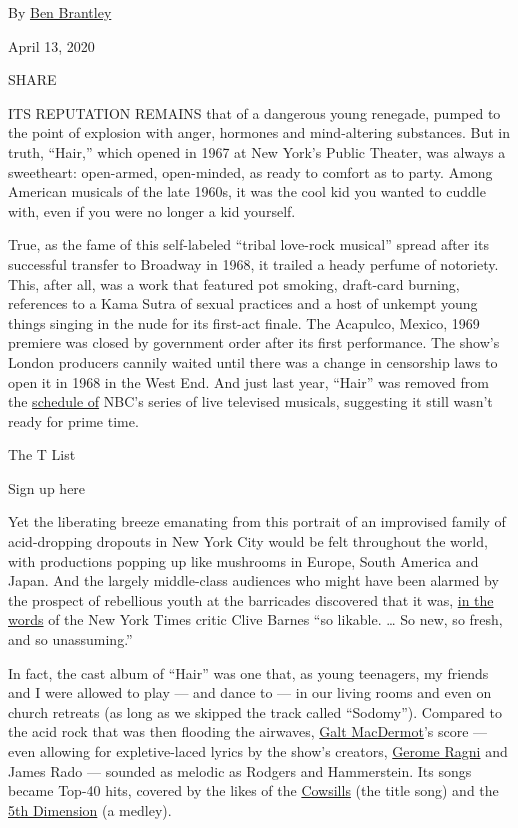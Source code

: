 By \href{https://www.nytimes.com/by/ben-brantley}{Ben Brantley}

April 13, 2020

SHARE

ITS REPUTATION REMAINS that of a dangerous young renegade, pumped to the
point of explosion with anger, hormones and mind-altering substances.
But in truth, ``Hair,'' which opened in 1967 at New York's Public
Theater, was always a sweetheart: open-armed, open-minded, as ready to
comfort as to party. Among American musicals of the late 1960s, it was
the cool kid you wanted to cuddle with, even if you were no longer a kid
yourself.

True, as the fame of this self-labeled ``tribal love-rock musical''
spread after its successful transfer to Broadway in 1968, it trailed a
heady perfume of notoriety. This, after all, was a work that featured
pot smoking, draft-card burning, references to a Kama Sutra of sexual
practices and a host of unkempt young things singing in the nude for its
first-act finale. The Acapulco, Mexico, 1969 premiere was closed by
government order after its first performance. The show's London
producers cannily waited until there was a change in censorship laws to
open it in 1968 in the West End. And just last year, ``Hair'' was
removed from the
\href{https://www.nytimes.com/2018/05/25/arts/television/hair-live-nbc.html}{schedule
of} NBC's series of live televised musicals, suggesting it still wasn't
ready for prime time.

The T List \textbar{}

Sign up here

Yet the liberating breeze emanating from this portrait of an improvised
family of acid-dropping dropouts in New York City would be felt
throughout the world, with productions popping up like mushrooms in
Europe, South America and Japan. And the largely middle-class audiences
who might have been alarmed by the prospect of rebellious youth at the
barricades discovered that it was,
\href{https://www.nytimes.com/1968/04/30/archives/theater-hair-its-fresh-and-frank-likable-rock-musical-moves-to.html}{in
the words} of the New York Times critic Clive Barnes ``so likable.
\ldots{} So new, so fresh, and so unassuming.''

In fact, the cast album of ``Hair'' was one that, as young teenagers, my
friends and I were allowed to play --- and dance to --- in our living
rooms and even on church retreats (as long as we skipped the track
called ``Sodomy''). Compared to the acid rock that was then flooding the
airwaves,
\href{https://www.nytimes.com/2018/12/18/obituaries/galt-macdermot-dead.html}{Galt
MacDermot}'s score --- even allowing for expletive-laced lyrics by the
show's creators,
\href{https://www.nytimes.com/1991/07/13/obituaries/gerome-ragni-48-a-stage-actor-co-author-of-broadway-s-hair.html}{Gerome
Ragni} and James Rado --- sounded as melodic as Rodgers and Hammerstein.
Its songs became Top-40 hits, covered by the likes of the
\href{https://www.nytimes.com/2006/02/21/arts/music/william-cowsill-58-leader-of-family-poprock-band-dies.html}{Cowsills}
(the title song) and the
\href{https://www.nytimes.com/2001/08/04/arts/ron-townson-68-singer-in-fifth-dimension.html}{5th
Dimension} (a medley).

